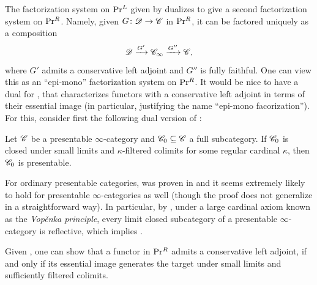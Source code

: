\documentclass[12pt]{article}
\begin{document}
The factorization system on $\mathrm{Pr}{}^L$ given by  dualizes  to give a second factorization system on $\mathrm{Pr}{}^R$. Namely, given $G\colon \mathscr{D} \to \mathscr{C}$ in $\mathrm{Pr}{}^R$, it can be factored uniquely as a composition
\[
    \mathscr{D} \xrightarrow{G'} \mathscr{C}_\infty \xrightarrow{G''} \mathscr{C},  
\]
where $G'$ admits a conservative left adjoint and $G''$ is fully faithful. One can view this as an ``epi-mono'' factorization system on $\mathrm{Pr}{}^R$. It would be nice to have a dual for , that characterizes functors with a conservative left adjoint in terms of their essential image (in particular, justifying the name ``epi-mono facorization''). For this, consider first the following dual version of :


\begin{conj}\label{Shauli_Thesis}
    Let $\mathscr{C}$ be a presentable $\infty$-category and $\mathscr{C}_0\subseteq \mathscr{C}$ a full subcategory. If $\mathscr{C}_0$ is closed under small limits and $\kappa$-filtered colimits for some regular cardinal $\kappa$, then $\mathscr{C}_0$ is presentable. 
\end{conj}

\begin{rem}
    For ordinary presentable categories,  was proven in \cite{adamek1989reflections} and it seems extremely likely to hold for presentable $\infty$-categories as well (though the proof does not generalize in a straightforward way). In particular, by \cite{rosicky2003left}, under a large cardinal axiom known as the \textit{Vop\v{e}nka principle}, every limit closed subcategory of a presentable $\infty$-category is reflective, which implies .
\end{rem}

Given , one can show that a functor in $\mathrm{Pr}{}^R$ admits a conservative left adjoint, if and only if its essential image generates the target under small limits and sufficiently filtered colimits.
\end{document}
